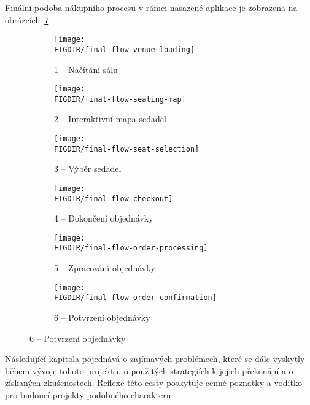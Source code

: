 Finální podoba nákupního procesu v rámci nasazené aplikace je zobrazena na obrázcích~\ref{fig:final-flow}

\begin{figure}[p]
    \centering
    \caption{Kompletní nákupní proces}
    \hfill
    \begin{subfigure}{0.48\textwidth}
        \texttt{[image: \\FIGDIR/final-flow-venue-loading]}
        \caption{1 – Načítání sálu}
        \label{fig:final-flow-venue-loading}
    \end{subfigure}
    \hfill
    \begin{subfigure}{0.48\textwidth}
        \texttt{[image: \\FIGDIR/final-flow-seating-map]}
        \caption{2 – Interaktivní mapa sedadel}
        \label{fig:final-flow-seating-map}
    \end{subfigure}
    \hfill
    \begin{subfigure}{0.48\textwidth}
        \texttt{[image: \\FIGDIR/final-flow-seat-selection]}
        \caption{3 – Výběr sedadel}
        \label{fig:final-flow-seat-selection}
    \end{subfigure}
    \hfill
    \begin{subfigure}{0.48\textwidth}
        \texttt{[image: \\FIGDIR/final-flow-checkout]}
        \caption{4 – Dokončení objednávky}
        \label{fig:final-flow-checkout}
    \end{subfigure}
    \hfill
    \begin{subfigure}{0.48\textwidth}
        \texttt{[image: \\FIGDIR/final-flow-order-processing]}
        \caption{5 – Zpracování objednávky}
        \label{fig:final-flow-order-processing}
    \end{subfigure}
    \hfill
    \begin{subfigure}{0.48\textwidth}
        \texttt{[image: \\FIGDIR/final-flow-order-confirmation]}
        \caption{6 – Potvrzení objednávky}
        \label{fig:final-flow-order-confirmation}
    \end{subfigure}
    \source{}
    \label{fig:final-flow}
\end{figure}

Následující kapitola pojednává o zajímavých problémech, které se dále vyskytly během vývoje tohoto projektu, o použitých strategiích k jejich překonání a o získaných zkušenostech.
Reflexe této cesty poskytuje cenné poznatky a vodítko pro budoucí projekty podobného charakteru.
